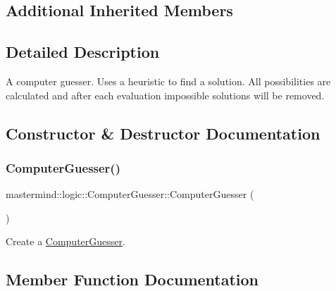 \subsection*{Additional Inherited Members}


\subsection{Detailed Description}
A computer guesser. Uses a heuristic to find a solution. All possibilities are calculated and after each evaluation impossible solutions will be removed. 

\subsection{Constructor \& Destructor Documentation}
\hypertarget{classmastermind_1_1logic_1_1_computer_guesser_a56134030aac585a8cdbe1e42d544b653}{}\label{classmastermind_1_1logic_1_1_computer_guesser_a56134030aac585a8cdbe1e42d544b653} 
\subsubsection{\texorpdfstring{Computer\+Guesser()}{ComputerGuesser()}}
{\footnotesize\ttfamily mastermind\+::logic\+::\+Computer\+Guesser\+::\+Computer\+Guesser (\begin{DoxyParamCaption}{ }\end{DoxyParamCaption})}



Create a \hyperlink{classmastermind_1_1logic_1_1_computer_guesser}{Computer\+Guesser}. 



\subsection{Member Function Documentation}
\hypertarget{classmastermind_1_1logic_1_1_computer_guesser_ae93df46297030bcbd924f5ddc4af4889}{}\label{classmastermind_1_1logic_1_1_computer_guesser_ae93df46297030bcbd924f5ddc4af4889} 
